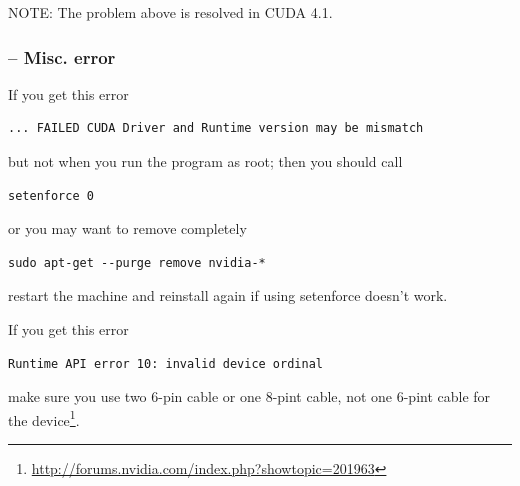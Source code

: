 NOTE: The problem above is resolved in CUDA 4.1.

\subsubsection{-- Misc. error}

If you get this error 
\begin{verbatim}
... FAILED CUDA Driver and Runtime version may be mismatch
\end{verbatim}
but not when you run the program as root; then you should call
\begin{verbatim}
setenforce 0
\end{verbatim}
or you may want to remove completely
\begin{verbatim}
sudo apt-get --purge remove nvidia-*
\end{verbatim}
restart the machine and reinstall again if using setenforce doesn't
work.

If you get this error
\begin{verbatim}
Runtime API error 10: invalid device ordinal
\end{verbatim}
make sure you use two 6-pin cable or one 8-pint cable, not one 6-pint cable for
the device\footnote{\url{http://forums.nvidia.com/index.php?showtopic=201963}}. 


